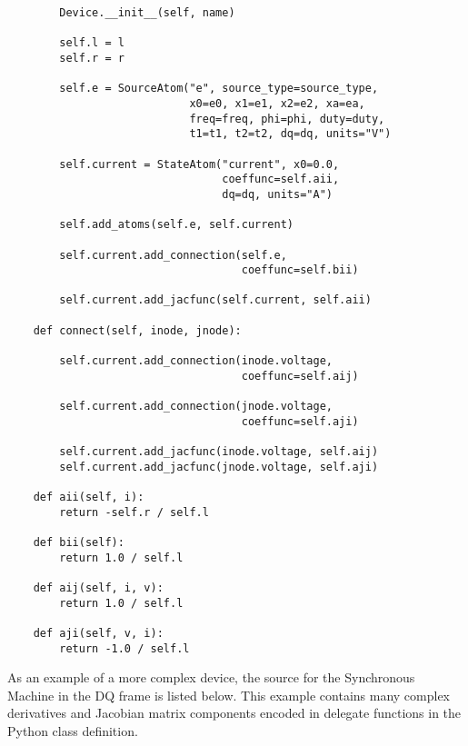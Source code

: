 \begin{lstlisting}
        Device.__init__(self, name)

        self.l = l
        self.r = r

        self.e = SourceAtom("e", source_type=source_type,
                            x0=e0, x1=e1, x2=e2, xa=ea,
                            freq=freq, phi=phi, duty=duty,
                            t1=t1, t2=t2, dq=dq, units="V")

        self.current = StateAtom("current", x0=0.0,
                                 coeffunc=self.aii,
                                 dq=dq, units="A")

        self.add_atoms(self.e, self.current)
        
        self.current.add_connection(self.e,
                                    coeffunc=self.bii)
        
        self.current.add_jacfunc(self.current, self.aii)

    def connect(self, inode, jnode):

        self.current.add_connection(inode.voltage,
                                    coeffunc=self.aij)
        
        self.current.add_connection(jnode.voltage,
                                    coeffunc=self.aji)
        
        self.current.add_jacfunc(inode.voltage, self.aij)
        self.current.add_jacfunc(jnode.voltage, self.aji)

    def aii(self, i):
        return -self.r / self.l

    def bii(self):
        return 1.0 / self.l

    def aij(self, i, v):
        return 1.0 / self.l

    def aji(self, v, i):
        return -1.0 / self.l
\end{lstlisting}

As an example of a more complex device, the source for the Synchronous Machine in the DQ frame is listed below. This example contains many complex derivatives and Jacobian matrix components encoded in delegate functions in the Python class definition.

\bigskip

